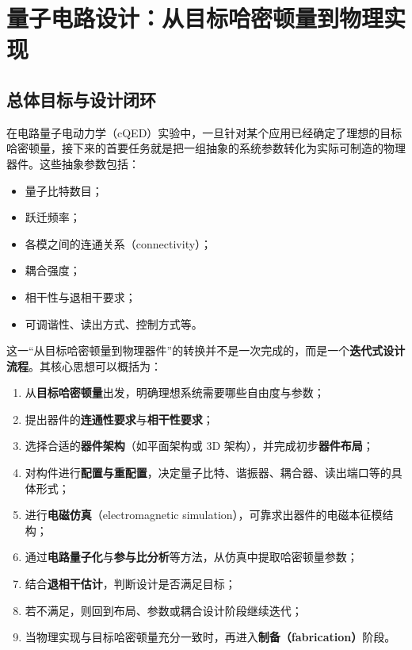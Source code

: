 \documentclass[12pt,a4paper,oneside]{ctexbook}
\begin{document}
\section{量子电路设计：从目标哈密顿量到物理实现}

\subsection{总体目标与设计闭环}

在电路量子电动力学（cQED）实验中，一旦针对某个应用已经确定了理想的目标哈密顿量，接下来的首要任务就是把一组抽象的系统参数转化为实际可制造的物理器件。这些抽象参数包括：
\begin{itemize}
    \item 量子比特数目；
    \item 跃迁频率；
    \item 各模之间的连通关系（connectivity）；
    \item 耦合强度；
    \item 相干性与退相干要求；
    \item 可调谐性、读出方式、控制方式等。
\end{itemize}

这一“从目标哈密顿量到物理器件”的转换并不是一次完成的，而是一个\textbf{迭代式设计流程}。其核心思想可以概括为：

\begin{enumerate}
    \item 从\textbf{目标哈密顿量}出发，明确理想系统需要哪些自由度与参数；
    \item 提出器件的\textbf{连通性要求}与\textbf{相干性要求}；
    \item 选择合适的\textbf{器件架构}（如平面架构或 3D 架构），并完成初步\textbf{器件布局}；
    \item 对构件进行\textbf{配置与重配置}，决定量子比特、谐振器、耦合器、读出端口等的具体形式；
    \item 进行\textbf{电磁仿真}（electromagnetic simulation），可靠求出器件的电磁本征模结构；
    \item 通过\textbf{电路量子化}与\textbf{参与比分析}等方法，从仿真中提取哈密顿量参数；
    \item 结合\textbf{退相干估计}，判断设计是否满足目标；
    \item 若不满足，则回到布局、参数或耦合设计阶段继续迭代；
    \item 当物理实现与目标哈密顿量充分一致时，再进入\textbf{制备（fabrication）}阶段。
\end{enumerate}
\end{document}
